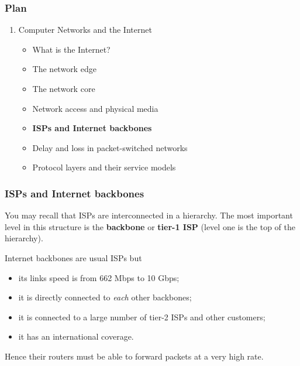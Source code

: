 
%
\begin{frame}
\frametitle{Plan}

\begin{enumerate}

  \item Computer Networks and the Internet

    \begin{itemize}

      \item What is the Internet?

      \item The network edge

      \item The network core

      \item Network access and physical media

      \item \textbf{ISPs and Internet backbones}

      \item Delay and loss in packet-switched networks

      \item Protocol layers and their service models

    \end{itemize}

\end{enumerate}

\end{frame}

%
\begin{frame}
\frametitle{ISPs and Internet backbones}

You may recall that ISPs are interconnected in a hierarchy. The most
important level in this structure is the \textbf{backbone} or
\textbf{tier-1 ISP} (level one is the top of the hierarchy).

\bigskip

Internet backbones are usual ISPs but
\begin{itemize}

  \item its links speed is from 662 Mbps to 10 Gbps;

  \item it is directly connected to \emph{each} other backbones;

  \item it is connected to a large number of tier-2 ISPs and other
  customers;

  \item it has an international coverage.

\end{itemize}
Hence their routers must be able to forward packets at a very high
rate.

\end{frame}

